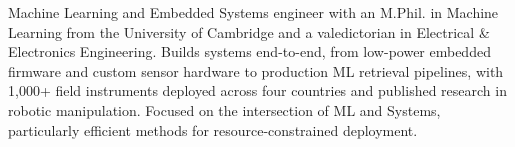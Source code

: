 \noindent
Machine Learning and Embedded Systems engineer with an M.Phil. in Machine Learning from the University of Cambridge and a valedictorian in Electrical \& Electronics Engineering. Builds systems end-to-end, from low-power embedded firmware and custom sensor hardware to production ML retrieval pipelines, with 1{,}000+ field instruments deployed across four countries and published research in robotic manipulation. Focused on the intersection of ML and Systems, particularly efficient methods for resource-constrained deployment.

